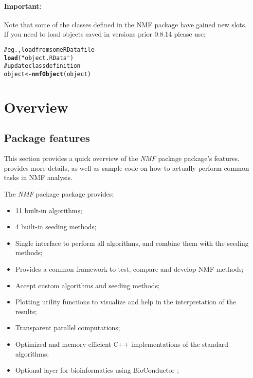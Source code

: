 \documentclass[a4paper]{article}\usepackage{graphicx, color}
\makeatletter
\newcommand{\hlfunctioncall}[1]{\textcolor[rgb]{0.501960784313725,0,0.329411764705882}{\textbf{#1}}}%
\newcommand{\hlstring}[1]{\textcolor[rgb]{0.6,0.6,1}{#1}}%
\newcommand{\hlcomment}[1]{\textcolor[rgb]{0.180392156862745,0.6,0.341176470588235}{#1}}%
\newenvironment{kframe}{%
 \def\at@end@of@kframe{}%
 \ifinner\ifhmode%
  \def\at@end@of@kframe{\end{minipage}}%
  \begin{minipage}{\columnwidth}%
 \fi\fi%
 \def\FrameCommand##1{\hskip\@totalleftmargin \hskip-\fboxsep
 \colorbox{shadecolor}{##1}\hskip-\fboxsep
     \hskip-\linewidth \hskip-\@totalleftmargin \hskip\columnwidth}%
 \MakeFramed {\advance\hsize-\width
   \@totalleftmargin\z@ \linewidth\hsize
   \@setminipage}}%
 {\par\unskip\endMakeFramed%
 \at@end@of@kframe}
\newenvironment{knitrout}{}{} %
\newcommand{\pkgname}[1]{\textit{#1}\xspace}
\newcommand{\Rpkg}[1]{\pkgname{#1} package\xspace}
\newcommand{\nmfpack}{\Rpkg{NMF}}
\renewcommand{\cite}[1]{\parencite{#1}}
\makeatother
\begin{document}
\paragraph{Important:} Note that some of the classes defined in the NMF package have gained new slots.
If you need to load objects saved in versions prior 0.8.14 please use:

\begin{knitrout}
\color{fgcolor}\begin{kframe}
\begin{alltt}
\hlcomment{# eg., load from some RData file}
\hlfunctioncall{load}(\hlstring{"object.RData"})
\hlcomment{# update class definition}
object <- \hlfunctioncall{nmfObject}(object)
\end{alltt}
\end{kframe}
\end{knitrout}


\pagebreak
\tableofcontents
\pagebreak

\section{Overview}

\subsection{Package features}

This section provides a quick overview of the \nmfpack package's features.
 provides more details, as well as sample code on how to actually perform common tasks in NMF analysis.




The \nmfpack package provides:
\begin{itemize}
\item 11 built-in algorithms;
\item 4 built-in seeding methods;
\item Single interface to perform all algorithms, and combine them with the seeding methods;
\item Provides a common framework to test, compare and develop NMF methods;
\item Accept custom algorithms and seeding methods;
\item Plotting utility functions to visualize and help in the interpretation of the results;
\item Transparent parallel computations;
\item Optimized and memory efficient C++ implementations of the standard algorithms;
\item Optional layer for bioinformatics using BioConductor \cite{Gentleman2004};
\end{itemize}
\end{document}
